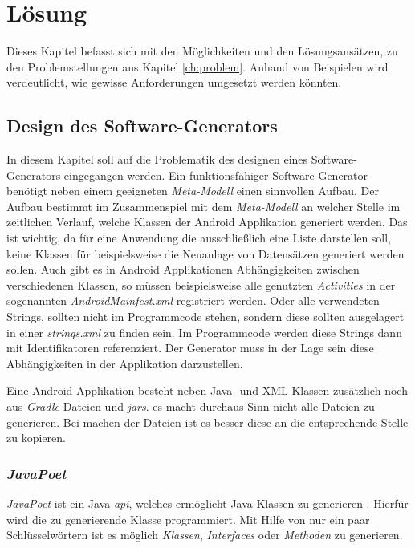 \chapter{Lösung}
Dieses Kapitel befasst sich mit den Möglichkeiten und den Lösungsansätzen, zu den Problemstellungen aus Kapitel \ref{ch:problem}. Anhand von Beispielen wird verdeutlicht, wie gewisse Anforderungen umgesetzt werden könnten.

\section{Design des Software-Generators}
In diesem Kapitel soll auf die Problematik des designen eines Software-Generators eingegangen werden. Ein funktionsfähiger Software-Generator benötigt neben einem geeigneten \textit{Meta-Modell} einen sinnvollen Aufbau. Der Aufbau bestimmt im Zusammenspiel mit dem \textit{Meta-Modell} an welcher Stelle im zeitlichen Verlauf, welche Klassen der Android Applikation generiert werden. Das ist wichtig, da für eine Anwendung die ausschließlich eine Liste darstellen soll, keine Klassen für beispielsweise die Neuanlage von Datensätzen generiert werden sollen. 
Auch gibt es in Android Applikationen Abhängigkeiten zwischen verschiedenen Klassen, so müssen beispielsweise alle genutzten \textit{Activities} in der sogenannten \textit{AndroidMainfest.xml} registriert werden. Oder alle verwendeten Strings, sollten nicht im Programmcode stehen, sondern diese sollten ausgelagert in einer \textit{strings.xml} zu finden sein. Im Programmcode werden diese Strings dann mit Identifikatoren referenziert. Der Generator muss in der Lage sein diese Abhängigkeiten in der Applikation darzustellen. 

Eine Android Applikation besteht neben Java- und XML-Klassen zusätzlich noch aus \textit{Gradle}-Dateien und \textit{\acfp{jar}}. es macht durchaus Sinn nicht alle Dateien zu generieren. Bei machen der Dateien ist es besser diese an die entsprechende Stelle zu kopieren.

\subsection{\textit{JavaPoet}}
\textit{JavaPoet} ist ein Java \textit{\ac{api}}, welches ermöglicht Java-Klassen zu generieren \cite{poet}. Hierfür wird die zu generierende Klasse programmiert. Mit Hilfe von nur ein paar Schlüsselwörtern ist es möglich \textit{Klassen}, \textit{Interfaces} oder \textit{Methoden} zu generieren. 

